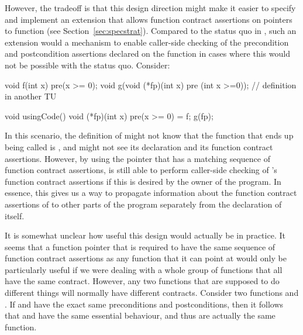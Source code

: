 However, the tradeoff is that  this design direction might make it easier to specify and implement an extension that allows function contract assertions on pointers to function (see Section~\ref{sec:specstrat}). Compared to the status quo in \cite{P2900R7}, such an extension would a mechanism to enable caller-side checking of the precondition and postcondition assertions declared on the function in cases where this would not be possible with the status quo. Consider:
\begin{codeblock}
void f(int x) pre(x >= 0);
void g(void (*fp)(int x) pre (int x >=0)); // definition in another TU

void usingCode() {
   void (*fp)(int x) pre(x >= 0) = f;
   g(fp);
}
\end{codeblock}
In this scenario, the definition of  might not know that the function that ends up being called is , and might not see its declaration and its function contract assertions. However, by using the pointer  that has a matching sequence of function contract assertions,  is still able to perform caller-side checking of 's function contract assertions if this is desired by the owner of the program. In essence, this gives us a way to propagate information about the function contract assertions of  to other parts of the program separately from the declaration of  itself.

It is somewhat unclear how useful this design would actually be in practice. It seems that a function pointer that is required to have the same sequence of function contract assertions as any function that it can point at would only be particularly useful if we were dealing with a whole group of functions that all have the same contract. However, any two functions that are supposed to do different things will normally have different contracts. Consider two functions  and . If  and  have the exact same preconditions and postconditions, then it follows that  and  have the same essential behaviour, and thus are actually the same function.

